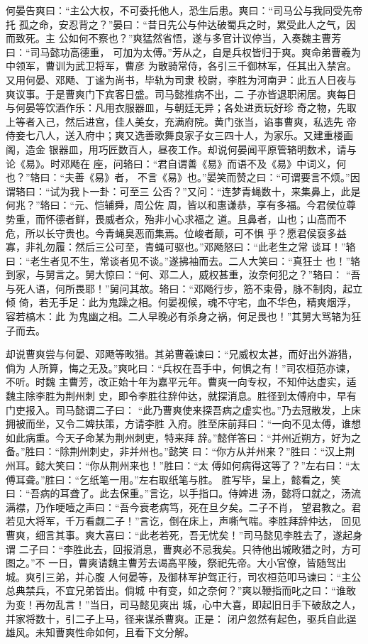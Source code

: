 何晏告爽曰：“主公大权，不可委托他人，恐生后患。爽曰：“司马公与我同受先帝托
孤之命，安忍背之？”晏曰：“昔日先公与仲达破蜀兵之时，累受此人之气，因而致死。主
公如何不察也？”爽猛然省悟，遂与多官计议停当，入奏魏主曹芳曰：“司马懿功高德重，
可加为太傅。”芳从之，自是兵权皆归于爽。爽命弟曹羲为中领军，曹训为武卫将军，曹彦
为散骑常侍，各引三千御林军，任其出入禁宫。又用何晏、邓飏、丁谧为尚书，毕轨为司隶
校尉，李胜为河南尹：此五人日夜与爽议事。于是曹爽门下宾客日盛。司马懿推病不出，二
子亦皆退职闲居。爽每日与何晏等饮酒作乐：凡用衣服器皿，与朝廷无异；各处进贡玩好珍
奇之物，先取上等者入己，然后进宫，佳人美女，充满府院。黄门张当，谄事曹爽，私选先
帝侍妾七八人，送入府中；爽又选善歌舞良家子女三四十人，为家乐。又建重楼画阁，造金
银器皿，用巧匠数百人，昼夜工作。却说何晏闻平原管辂明数术，请与论《易》。时邓飏在
座，问辂曰：“君自谓善《易》而语不及《易》中词义，何也？”辂曰：“夫善《易》者，
不言《易》也。”晏笑而赞之曰：“可谓要言不烦。”因谓辂曰：“试为我卜一卦：可至三
公否？”又问：“连梦青蝇数十，来集鼻上，此是何兆？”辂曰：“元、恺辅舜，周公佐
周，皆以和惠谦恭，享有多福。今君侯位尊势重，而怀德者鲜，畏威者众，殆非小心求福之
道。且鼻者，山也；山高而不危，所以长守贵也。今青蝇臭恶而集焉。位峻者颠，可不惧
乎？愿君侯裒多益寡，非礼勿履：然后三公可至，青蝇可驱也。”邓飏怒曰：“此老生之常
谈耳！”辂曰：“老生者见不生，常谈者见不谈。”遂拂袖而去。二人大笑曰：“真狂士
也！”辂到家，与舅言之。舅大惊曰：“何、邓二人，威权甚重，汝奈何犯之？”辂曰：
“吾与死人语，何所畏耶！”舅问其故。辂曰：“邓飏行步，筋不束骨，脉不制肉，起立倾
倚，若无手足：此为鬼躁之相。何晏视候，魂不守宅，血不华色，精爽烟浮，容若槁木：此
为鬼幽之相。二人早晚必有杀身之祸，何足畏也！”其舅大骂辂为狂子而去。

却说曹爽尝与何晏、邓飏等畋猎。其弟曹羲谏曰：“兄威权太甚，而好出外游猎，倘为
人所算，悔之无及。”爽叱曰：“兵权在吾手中，何惧之有！”司农桓范亦谏，不听。时魏
主曹芳，改正始十年为嘉平元年。曹爽一向专权，不知仲达虚实，适魏主除李胜为荆州刺
史，即令李胜往辞仲达，就探消息。胜径到太傅府中，早有门吏报入。司马懿谓二子曰：
“此乃曹爽使来探吾病之虚实也。”乃去冠散发，上床拥被而坐，又令二婢扶策，方请李胜
入府。胜至床前拜曰：“一向不见太傅，谁想如此病重。今天子命某为荆州刺吏，特来拜
辞。”懿佯答曰：“并州近朔方，好为之备。”胜曰：“除荆州刺史，非并州也。”懿笑
曰：“你方从并州来？”胜曰：“汉上荆州耳。懿大笑曰：“你从荆州来也！”胜曰：“太
傅如何病得这等了？”左右曰：“太傅耳聋。”胜曰：“乞纸笔一用。”左右取纸笔与胜。
胜写毕，呈上，懿看之，笑曰：“吾病的耳聋了。此去保重。”言讫，以手指口。侍婢进
汤，懿将口就之，汤流满襟，乃作哽噎之声曰：“吾今衰老病笃，死在旦夕矣。二子不肖，
望君教之。君若见大将军，千万看觑二子！”言讫，倒在床上，声嘶气喘。李胜拜辞仲达，
回见曹爽，细言其事。爽大喜曰：“此老若死，吾无忧矣！”司马懿见李胜去了，遂起身谓
二子曰：“李胜此去，回报消息，曹爽必不忌我矣。只待他出城畋猎之时，方可图之。”不
一日，曹爽请魏主曹芳去谒高平陵，祭祀先帝。大小官僚，皆随驾出城。爽引三弟，并心腹
人何晏等，及御林军护驾正行，司农桓范叩马谏曰：“主公总典禁兵，不宜兄弟皆出。倘城
中有变，如之奈何？”爽以鞭指而叱之曰：“谁敢为变！再勿乱言！”当日，司马懿见爽出
城，心中大喜，即起旧日手下破敌之人，并家将数十，引二子上马，径来谋杀曹爽。正是：
闭户忽然有起色，驱兵自此逞雄风。未知曹爽性命如何，且看下文分解。